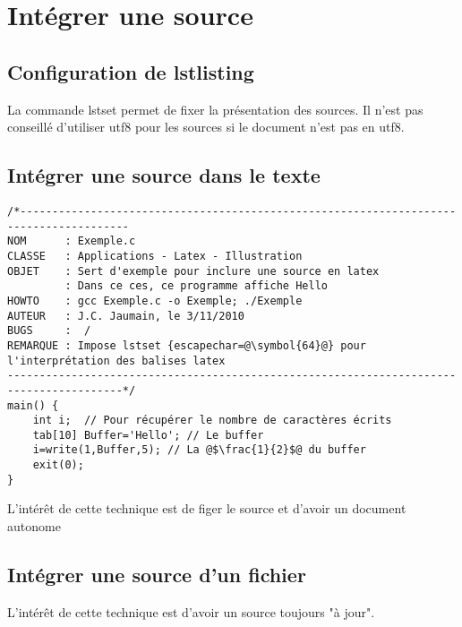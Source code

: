 \section{Intégrer une source}
\subsection{Configuration de lstlisting}
La commande lstset permet de fixer la présentation des sources. Il n'est pas conseillé d'utiliser utf8 pour les sources si le document n'est pas en utf8.
\subsection{Intégrer une source dans le texte}
\begin{lstlisting}
/*---------------------------------------------------------------------------------------
NOM      : Exemple.c
CLASSE   : Applications - Latex - Illustration
OBJET    : Sert d'exemple pour inclure une source en latex
         : Dans ce ces, ce programme affiche Hello
HOWTO    : gcc Exemple.c -o Exemple; ./Exemple
AUTEUR   : J.C. Jaumain, le 3/11/2010
BUGS     :  /
REMARQUE : Impose lstset {escapechar=@\symbol{64}@} pour l'interprétation des balises latex
----------------------------------------------------------------------------------------*/
main() {
	int i;  // Pour récupérer le nombre de caractères écrits
	tab[10] Buffer='Hello'; // Le buffer
	i=write(1,Buffer,5); // La @$\frac{1}{2}$@ du buffer
	exit(0);
}
\end{lstlisting}

L'intérêt de cette technique est de figer le source et d'avoir un document autonome

\subsection{Intégrer une source d'un fichier}



L'intérêt de cette technique est d'avoir un source toujours "à jour".



